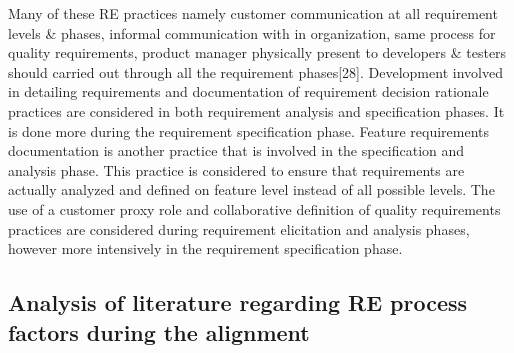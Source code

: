 \documentclass{article}
\begin{document}
Many of these RE practices namely customer communication at all requirement levels & phases, informal communication with in organization, same process for quality requirements, product manager physically present to developers & testers should carried out through all the requirement phases[28]. Development involved in detailing requirements and documentation of requirement decision rationale practices are considered in both requirement analysis and specification phases. It is done more during the requirement specification phase. Feature requirements documentation is another practice that is involved in the specification and analysis phase. This practice is considered to ensure that requirements are actually analyzed and defined on feature level instead of all possible levels. The use of a customer proxy role and collaborative definition of quality requirements practices are considered during requirement elicitation and analysis phases, however more intensively in the requirement specification phase.

\subsection{Analysis of literature regarding RE process factors during the alignment}\label{ResultsProcessFactors}
\end{document}
